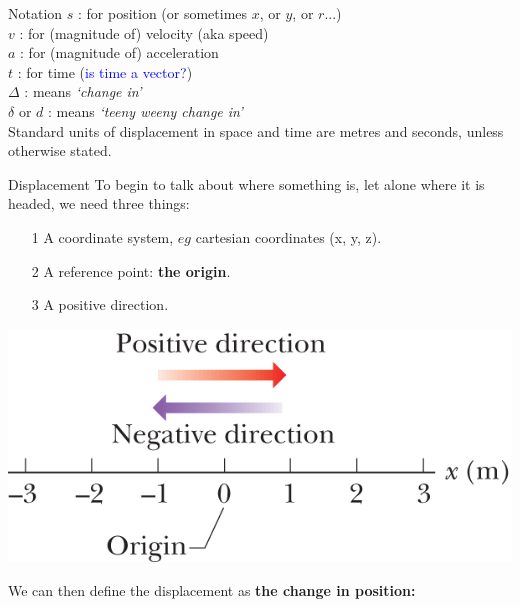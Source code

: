 %  
\begin{frame}{Notation}
$s$ : for position (or sometimes $x$, or $y$, or $r$...)\\
$v$ : for (magnitude of) velocity (aka speed)\\
$a$ : for (magnitude of) acceleration\\
$t$ : for time (\textcolor{blue}{is time a vector?})\\[1ex]
$\Delta$ : means \textit{`change in'} \\[1ex]
$\delta$ or $d$ : means \textit{`teeny weeny change in'} \\[1ex]

Standard units of displacement in space and time are metres and seconds, unless otherwise stated.\\

\end{frame}
 
% 
\begin{frame}{Displacement}
\small
To begin to talk about where something is, let alone where it is headed, we need three things:
\begin{itemize}
\item[1]  A coordinate system, $eg$ cartesian coordinates (x, y, z).
\item[2]  A reference point: \textbf{the origin}.\\[1ex]
\item[3]  A positive direction.\\[1ex]
\end{itemize}

\begin{center}
\includegraphics[scale=0.8]{1.png}
\end{center}

We can then define the displacement as \textbf{ the change in position:} \\[1ex]


\end{frame}
 
